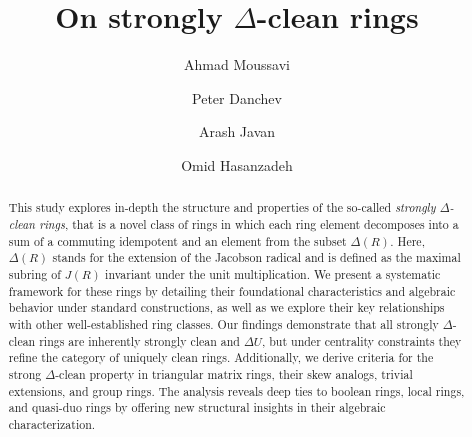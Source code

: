 \documentclass[12pt]{amsart}
\theoremstyle{definition}
\begin{document}
\author[A. Moussavi]{Ahmad Moussavi}
\address{Department of Mathematics, Tarbiat Modares University, 14115-111 Tehran Jalal AleAhmad Nasr, Iran}

\author[P. Danchev]{Peter Danchev}
\address{Institute of Mathematics and Informatics, Bulgarian Academy of Sciences, 1113 Sofia, Bulgaria}

\author[A. Javan]{Arash Javan}
\address{Department of Mathematics, Tarbiat Modares University, 14115-111 Tehran Jalal AleAhmad Nasr, Iran}

\author[O. Hasanzadeh]{Omid Hasanzadeh}
\address{Department of Mathematics, Tarbiat Modares University, 14115-111 Tehran Jalal AleAhmad Nasr, Iran}

\title{On strongly $\Delta$-clean rings}

\maketitle




\begin{abstract}
This study explores in-depth the structure and properties of the so-called {\it strongly $\Delta$-clean rings}, that is a novel class of rings in which each ring element decomposes into a sum of a commuting idempotent and an element from the subset $\Delta(R)$. Here, $\Delta(R)$ stands for the extension of the Jacobson radical and is defined as the maximal subring of $J(R)$ invariant under the unit multiplication. We present a systematic framework for these rings by detailing their foundational characteristics and algebraic behavior under standard constructions, as well as we explore their key relationships with other well-established ring classes. Our findings demonstrate that all strongly $\Delta$-clean rings are inherently strongly clean and $\Delta U$, but under centrality constraints they refine the category of uniquely clean rings. Additionally, we derive criteria for the strong $\Delta$-clean property in triangular matrix rings, their skew analogs, trivial extensions, and group rings. The analysis reveals deep ties to boolean rings, local rings, and quasi-duo rings by offering new structural insights in their algebraic characterization.
\end{abstract}
\end{document}
